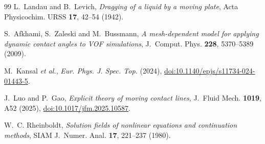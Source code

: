 \documentclass[11pt,a4paper]{article}
\begin{document}
\begin{thebibliography}{99}
L.~Landau and B.~Levich,
\emph{Dragging of a liquid by a moving plate},
Acta Physicochim. URSS \textbf{17}, 42--54 (1942).

S.~Afkhami, S.~Zaleski and M.~Bussmann,
\emph{A mesh-dependent model for applying dynamic contact angles to VOF
simulations}, J.~Comput. Phys. \textbf{228}, 5370--5389 (2009).

M.~Kansal \emph{et al.},
\emph{Eur. Phys. J. Spec. Top.} (2024),
\href{https://doi.org/10.1140/epjs/s11734-024-01443-5}
{doi:10.1140/epjs/s11734-024-01443-5}.

J.~Luo and P.~Gao,
\emph{Explicit theory of moving contact lines},
J.~Fluid Mech. \textbf{1019}, A52 (2025),
\href{https://doi.org/10.1017/jfm.2025.10587}
{doi:10.1017/jfm.2025.10587}.

W.~C. Rheinboldt,
\emph{Solution fields of nonlinear equations and continuation methods},
SIAM J.~Numer. Anal. \textbf{17}, 221--237 (1980).

\end{thebibliography}
\end{document}

